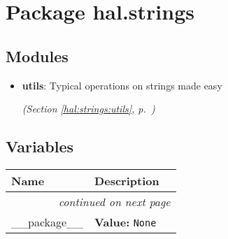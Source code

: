 %
%
%


\section{Package hal.strings}

    \label{hal:strings}


\subsection{Modules}

\begin{itemize}
\setlength{\parskip}{0ex}
\item \textbf{utils}: Typical operations on strings made easy 


  \textit{(Section \ref{hal:strings:utils}, p.~\pageref{hal:strings:utils})}

\end{itemize}



  \subsection{Variables}

    \vspace{-1cm}
\hspace{\varindent}\begin{longtable}{|p{\varnamewidth}|p{\vardescrwidth}|l}
\cline{1-2}
\cline{1-2} \centering \textbf{Name} & \centering \textbf{Description}& \\
\cline{1-2}
\endhead\cline{1-2}\multicolumn{3}{r}{\small\textit{continued on next page}}\\\endfoot\cline{1-2}
\endlastfoot\raggedright \_\-\_\-p\-a\-c\-k\-a\-g\-e\-\_\-\_\- & \raggedright \textbf{Value:} 
{\tt None}&\\
\cline{1-2}
\end{longtable}

